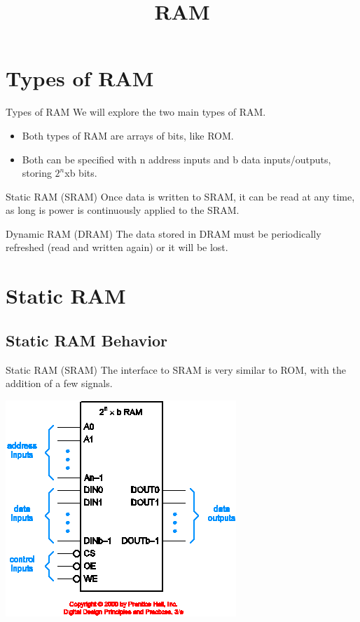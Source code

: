 \title{RAM}


\section{Types of RAM}

\begin{frame}{Types of RAM}
  We will explore the two main types of RAM.
  \begin{itemize}
    \item Both types of RAM are arrays of bits, like ROM.
    \item Both can be specified with n address inputs and b data inputs/outputs, storing $2^n$xb bits.
  \end{itemize}
  \begin{block}{Static RAM (SRAM)}
    Once data is written to SRAM, it can be read at any time, as long is power is continuously applied to the SRAM.
  \end{block}
  \begin{block}{Dynamic RAM (DRAM)}
    The data stored in DRAM must be periodically refreshed (read and written again) or it will be lost.
  \end{block}
\end{frame}

\section{Static RAM}

\subsection{Static RAM Behavior}

\begin{frame}{Static RAM (SRAM)}
  The interface to SRAM is very similar to ROM, with the addition of a few signals.\\
  \begin{center}
    \includegraphics[scale=0.4]{SRAMSchematic}
  \end{center}
\end{frame}

